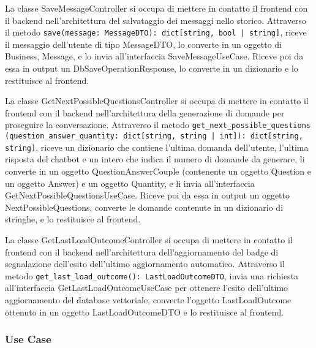 \label{sec:save_message_controller}
La classe SaveMessageController si occupa di mettere in contatto il frontend con il backend nell'architettura del salvataggio dei messaggi nello storico. Attraverso il metodo \texttt{save(message: MessageDTO): dict[string, bool | string]}, riceve il messaggio dell'utente di tipo MessageDTO, lo converte in un oggetto di Business, Message, e lo invia all'interfaccia SaveMessageUseCase. Riceve poi da essa in output un DbSaveOperationResponse, lo converte in un dizionario e lo restituisce al frontend.

\label{sec:get_next_possible_questions_controller}
La classe GetNextPossibleQuestionsController si occupa di mettere in contatto il frontend con il backend nell'architettura della generazione di domande per proseguire la conversazione. Attraverso il metodo \texttt{get\_next\_possible\_questions\\(question\_answer\_quantity: dict[string, string | int]): dict[string,\\ string]}, riceve un dizionario che contiene l'ultima domanda dell'utente, l'ultima risposta del chatbot e un intero che indica il numero di domande da generare, li converte in un oggetto QuestionAnswerCouple (contenente un oggetto Question e un oggetto Answer) e un oggetto Quantity, e li invia all'interfaccia GetNextPossibleQuestionsUseCase. Riceve poi da essa in output un oggetto NextPossibleQuestions, converte le domande contenute in un dizionario di stringhe, e lo restituisce al frontend.

\label{sec:get_last_load_outcome_controller}
La classe GetLastLoadOutcomeController si occupa di mettere in contatto il frontend con il backend nell'architettura dell'aggiornamento del badge di segnalazione dell'esito dell'ultimo aggiornamento automatico. Attraverso il metodo \texttt{get\_last\_load\_outcome(): LastLoadOutcomeDTO}, invia una richiesta all'interfaccia GetLastLoadOutcomeUseCase per ottenere l'esito dell'ultimo aggiornamento del database vettoriale, converte l'oggetto LastLoadOutcome ottenuto in un oggetto LastLoadOutcomeDTO e lo restituisce al frontend.

\newpage


\subsubsection{Use Case}
\label{sec:use_case}

